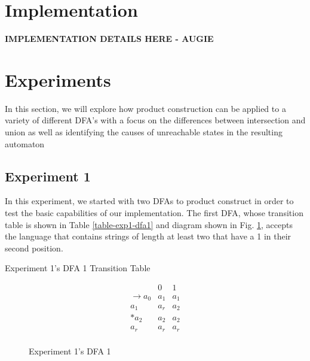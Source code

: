 \documentclass[conference]{IEEEtran}
\begin{document}
\section{Implementation}
\textbf{IMPLEMENTATION DETAILS HERE - AUGIE}

\section{Experiments}
In this section, we will explore how product construction can be applied to a variety of different DFA's with a focus on the differences between intersection and union as well as identifying the causes of unreachable states in the resulting automaton

\subsection{Experiment 1}
In this experiment, we started with two DFAs to product construct in order to test the basic capabilities of our implementation. The first DFA, whose transition table is shown in Table \ref{table-exp1-dfa1} and diagram shown in Fig. \ref{fig-exp1-dfa1}, accepts the language that contains strings of length at least two that have a 1 in their second position.

\begin{table}[h!]
    \caption{Experiment 1's DFA 1 Transition Table}
    \begin{displaymath}
        \begin{array}{r|c|c|}
        & 0 & 1 \\
        \hline
        \rightarrow a_0 & a_1 & a_1 \\
        a_1 & a_r & a_2 \\
        * a_2 & a_2 & a_2 \\
        a_r & a_r & a_r \\
        \end{array}
    \end{displaymath}
    \label{table-exp1-dfa1}
\end{table}
\begin{figure}[h!]
    \centering
    \caption{Experiment 1's DFA 1}
    \label{fig-exp1-dfa1}
\end{figure}
\end{document}
